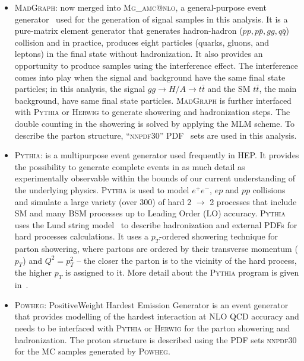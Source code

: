 \begin{itemize}
\item\textsc{MadGraph:} now merged into \textsc{Mg\_amc@nlo}, a general-purpose event generator~\cite{madgraph} used for the generation of signal samples in this analysis. It is a pure-matrix element generator that generates hadron-hadron ($pp, p\bar{p}, gg, q\bar{q}$) collision and in practice, produces eight particles (quarks, gluons, and leptons) in the final state without hadronization. It also provides an opportunity to produce samples using the interference effect. The interference comes into play when the signal and background have the same final state particles; in this analysis, the signal $gg\rightarrow H/A \rightarrow t\bar{t}$ and the SM $t\bar{t}$, the main background, have same final state particles. 
\textsc{MadGraph} is further interfaced with \textsc{Pythia} or \textsc{Herwig} to generate showering and hadronization steps. The double counting in the showering is solved by applying the MLM scheme. To describe the parton structure, ``\textsc{nnpdf30}'' PDF~\cite{pdf_sets} sets are used in this analysis. 

\item{\textsc{Pythia:}}\label{subsec:pythia} is a multipurpose event generator used frequently in HEP. It provides the possibility to generate complete events in as much detail as experimentally observable within the bounds of our current understanding of the underlying physics. \textsc{Pythia} is used to model $e^{+}e^{-}$, $ep$ and $pp$ collisions and simulate a large variety (over 300) of hard 2 $\rightarrow$ 2 processes that include SM and many BSM processes up to Leading Order (LO) accuracy. \textsc{Pythia} uses the Lund string model~\cite{lund_string_model} to describe hadronization and external PDFs for hard processes calculations. It uses a $p_{T}$-ordered showering technique for parton showering, where partons are ordered by their transverse momentum ($p_{T}$) and $Q^{2} = p^{2}_{T}$ – the closer the parton is to the vicinity of the hard process, the higher $p_{T}$ is assigned to it. More detail about the \textsc{Pythia} program is given in~\cite{pythia}.

\item{\textsc{Powheg:}} PositiveWeight Hardest Emission Generator is an event generator~\cite{powheg} that provides modelling of the hardest interaction at NLO QCD accuracy and needs to be interfaced with \textsc{Pythia} or \textsc{Herwig} for the parton showering and hadronization. The proton structure is described using the PDF sets \textsc{nnpdf30} for the MC samples generated by \textsc{Powheg}.


\end{itemize}
